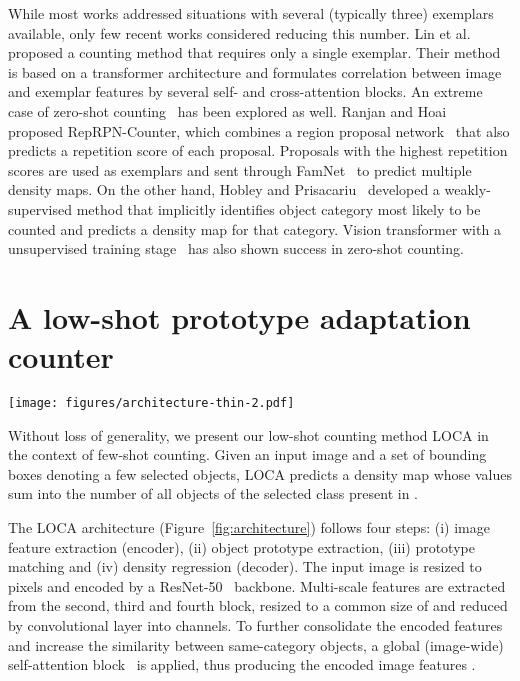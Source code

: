 \documentclass[10pt,twocolumn,letterpaper]{article}
\begin{document}
While most works addressed situations with several (typically three) exemplars available, only few recent works considered reducing this number.
Lin et al.~\cite{laonet} proposed a counting method that requires only a single exemplar. 
Their method is based on a transformer architecture and formulates correlation between image and exemplar features by several self- and cross-attention blocks. 
An extreme case of zero-shot counting~\cite{repprncount, hobley} has been explored as well.
Ranjan and Hoai~\cite{repprncount} proposed RepRPN-Counter, which combines a region proposal network~\cite{fasterrcnn} that also predicts a repetition score of each proposal. 
Proposals with the highest repetition scores are used as exemplars and sent through FamNet~\cite{famnet} to predict multiple density maps.
On the other hand, Hobley and Prisacariu~\cite{hobley} developed a weakly-supervised method that implicitly identifies object category most likely to be counted and predicts a density map for that category. Vision transformer with a unsupervised training stage~\cite{countr} has also shown success in zero-shot counting.


\section{A low-shot prototype adaptation counter}\label{sec:method}

\begin{figure*}[t]
    \centering
    \texttt{[image: figures/architecture-thin-2.pdf]}
    \caption{The LOCA architecture.
    Input image is encoded into features , which are depth-wise correlated (*) by  object queries predicted by the object prototype extraction module. 
    The response map  is obtained by computing per-element maximum of  similarity maps  and then upsampled by decoder to the final density map.}
    \label{fig:architecture}
\end{figure*}

Without loss of generality, we present our low-shot counting method LOCA in the context of few-shot counting.
Given an input image  and a set of  bounding boxes denoting a few selected objects, LOCA predicts a density map  whose values sum into the number of all objects of the selected class present in .

The LOCA architecture (Figure~\ref{fig:architecture}) follows four steps: 
(i) image feature extraction (encoder), 
(ii) object prototype extraction, 
(iii) prototype matching and (iv) density regression (decoder).
The input image is resized to  pixels and encoded by a ResNet-50~\cite{resnet} backbone. 
Multi-scale features are extracted from the second, third and fourth block, resized to a common size of  and reduced by  convolutional layer into  channels.
To further consolidate the encoded features and increase the similarity between same-category objects, a global (image-wide) self-attention block~\cite{transformer,detr} is applied, thus producing the encoded image features
.
\end{document}
